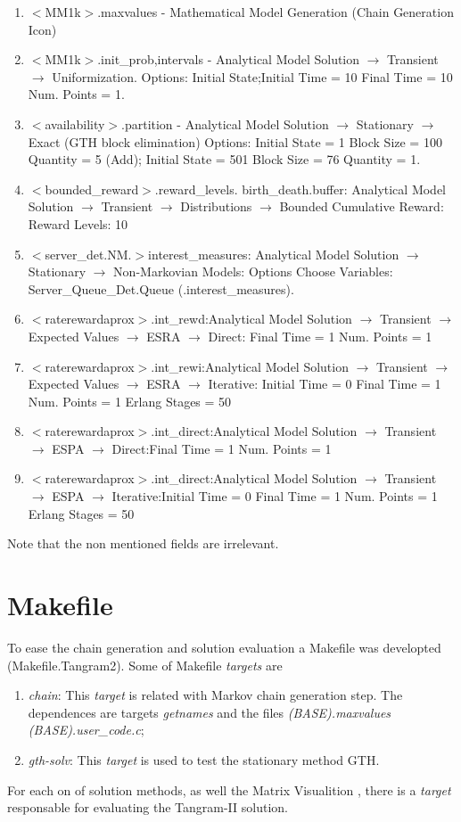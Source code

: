 \documentclass[english]{article}
\begin{document}
\begin{enumerate}
\item $<$MM1k$>$.maxvalues - Mathematical Model Generation (Chain Generation Icon)
\item $<$MM1k$>$.{init\_prob,intervals} - Analytical Model Solution
$\rightarrow$ Transient $\rightarrow$ 
Uniformization. Options: Initial State;Initial Time = 10 Final Time = 10 Num.
Points = 1.
\item $<$availability$>$.partition - Analytical Model Solution $\rightarrow$
Stationary $\rightarrow$ Exact (GTH block elimination) Options:  Initial State =
1 Block Size = 100  Quantity = 5 (Add); Initial State = 501 Block Size = 76
Quantity = 1.
\item $<$bounded\_reward$>$.reward\_levels. birth\_death.buffer: Analytical
Model Solution $\rightarrow$ Transient $\rightarrow$ Distributions $\rightarrow$
Bounded Cumulative Reward: Reward Levels: 10
\item
$<$server\_det.NM.$>${interest\_measures}: Analytical Model Solution
$\rightarrow$ Stationary $\rightarrow$ Non-Markovian Models: Options Choose
Variables: Server\_Queue\_Det.Queue (.interest\_measures). 
\item $<$raterewardaprox$>$.int\_rewd:Analytical Model Solution
$\rightarrow$  Transient $\rightarrow$ Expected Values $\rightarrow$ ESRA $\rightarrow$ Direct: Final Time = 1
Num. Points = 1
\item $<$raterewardaprox$>$.int\_rewi:Analytical Model Solution
$\rightarrow$  Transient $\rightarrow$ Expected Values $\rightarrow$ ESRA $\rightarrow$ Iterative: Initial
Time = 0 Final Time = 1 Num. Points = 1 Erlang Stages = 50
\item $<$raterewardaprox$>$.int\_direct:Analytical Model Solution
$\rightarrow$  Transient $\rightarrow$ ESPA $\rightarrow$ Direct:Final Time = 1
Num. Points = 1
\item $<$raterewardaprox$>$.int\_direct:Analytical Model Solution
$\rightarrow$  Transient $\rightarrow$ ESPA $\rightarrow$ Iterative:Initial
Time = 0 Final Time = 1 Num. Points = 1 Erlang Stages = 50
\end{enumerate}

Note that the non mentioned fields are irrelevant.
 
\section{Makefile}
\label{app:Makefile}

To ease the chain generation and solution evaluation a Makefile was developted (Makefile.Tangram2). Some of Makefile {\it targets} are

\begin{enumerate}
\item {\it chain}: This {\it target} is related with Markov chain generation step. The dependences are targets {\it getnames} and the files {\it (BASE).maxvalues (BASE).user\_code.c};
\item {\it gth-solv}: This {\it target} is used to test the stationary method GTH.
\end{enumerate}

For each on of solution methods, as well the Matrix Visualition , there is a {\it target} responsable for evaluating the Tangram-II solution.
\end{document}
